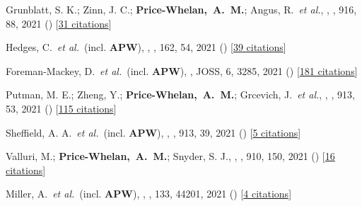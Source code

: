 \item[{\color{deemph}\scriptsize88}]Grunblatt, S. K.; Zinn, J. C.; \textbf{Price-Whelan,~A.~M.}; Angus, R.~\textit{et al.}, , \apj, 916, 88, 2021 () [\href{http://adsabs.harvard.edu/abs/2021ApJ...916...88G}{31 citations}]

\item[{\color{deemph}\scriptsize87}]Hedges, C.~\textit{et al.}~(incl. \textbf{APW}), , \aj, 162, 54, 2021 () [\href{http://adsabs.harvard.edu/abs/2021AJ....162...54H}{39 citations}]

\item[{\color{deemph}\scriptsize86}]Foreman-Mackey, D.~\textit{et al.}~(incl. \textbf{APW}), , JOSS, 6, 3285, 2021 () [\href{http://adsabs.harvard.edu/abs/2021JOSS....6.3285F}{181 citations}]

\item[{\color{deemph}\scriptsize85}]Putman, M. E.; Zheng, Y.; \textbf{Price-Whelan,~A.~M.}; Grcevich, J.~\textit{et al.}, , \apj, 913, 53, 2021 () [\href{http://adsabs.harvard.edu/abs/2021ApJ...913...53P}{115 citations}]

\item[{\color{deemph}\scriptsize84}]Sheffield, A. A.~\textit{et al.}~(incl. \textbf{APW}), , \apj, 913, 39, 2021 () [\href{http://adsabs.harvard.edu/abs/2021ApJ...913...39S}{5 citations}]

\item[{\color{deemph}\scriptsize83}]Valluri, M.; \textbf{Price-Whelan,~A.~M.}; Snyder, S. J., , \apj, 910, 150, 2021 () [\href{http://adsabs.harvard.edu/abs/2021ApJ...910..150V}{16 citations}]

\item[{\color{deemph}\scriptsize82}]Miller, A.~\textit{et al.}~(incl. \textbf{APW}), , \pasp, 133, 44201, 2021 () [\href{http://adsabs.harvard.edu/abs/2021PASP..133d4201M}{4 citations}]


